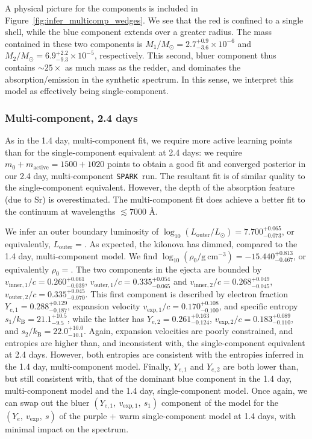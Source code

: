 \documentclass[twocolumn, twocolappendix]{aastex63}
\def\SPARK{\texttt{SPARK}}
\begin{document}
A physical picture for the components is included in Figure~\ref{fig:infer_multicomp_wedges}. We see that the red is confined to a single shell, while the blue component extends over a greater radius. The mass contained in these two components is $M_1/M_{\odot} = 2.7^{+0.9}_{-3.6} \times 10^{-6}$ and $M_2/M_{\odot} = 6.9^{+2.2}_{-9.3} \times 10^{-5}$, respectively. This second, bluer component thus contains $\sim 25 \times$ as much mass as the redder, and dominates the absorption/emission in the synthetic spectrum. In this sense, we interpret this model as effectively being single-component.



\subsubsection{Multi-component, 2.4 days}\label{sssc:2.4_multi}

As in the 1.4 day, multi-component fit, we require more active learning points than for the single-component equivalent at 2.4 days: we require $m_0 + m_{\mathrm{active}} = 1500 + 1020$ points to obtain a good fit and converged posterior in our 2.4 day, multi-component \SPARK~run. The resultant fit is of similar quality to the single-component equivalent. However, the depth of the absorption feature (due to Sr) is overestimated. The multi-component fit does achieve a better fit to the continuum at wavelengths $\lesssim 7000$ \AA. 

We infer an outer boundary luminosity of $\log_{10} (L_{\mathrm{outer}}/L_{\odot}) = 7.700^{+0.065}_{-0.073}$, or equivalently, $L_{\mathrm{outer}} = $. As expected, the kilonova has dimmed, compared to the 1.4 day, multi-component model. We find $\log_{10} (\rho_0 / \mathrm{g~cm^{-3}}) = -15.440^{+0.813}_{-0.467}$, or equivalently $\rho_0 = $. The two components in the ejecta are bounded by $v_{\mathrm{inner,1}}/c = 0.260^{+0.061}_{-0.039}$, $v_{\mathrm{outer,1}}/c = 0.335^{+0.054}_{-0.065}$ and $v_{\mathrm{inner,2}}/c = 0.268^{+0.049}_{-0.045}$, $v_{\mathrm{outer,2}}/c = 0.335^{+0.045}_{-0.070}$. This first component is described by electron fraction $Y_{e,1} = 0.288^{+0.129}_{-0.187}$, expansion velocity $v_{\mathrm{exp},1}/c = 0.170^{+0.108}_{-0.100}$, and specific entropy $s_1 / k_{\mathrm{B}} = 21.1^{+10.5}_{-9.5}$, while the latter has $Y_{e,2} = 0.261^{+0.163}_{-0.124}$, $v_{\mathrm{exp},2}/c = 0.183^{+0.089}_{-0.110}$, and $s_2 / k_{\mathrm{B}} = 22.0^{+10.0}_{-10.1}$. Again, expansion velocities are poorly constrained, and entropies are higher than, and inconsistent with, the single-component equivalent at 2.4 days. However, both entropies are consistent with the entropies inferred in the 1.4 day, multi-component model. Finally, $Y_{e,1}$ and $Y_{e,2}$ are both lower than, but still consistent with, that of the dominant blue component in the 1.4 day, multi-component model and the 1.4 day, single-component model. Once again, we can swap out the bluer $(Y_{e,1},~v_{\mathrm{exp},1},~s_1)$ component of the model for the $(Y_e,~v_{\mathrm{exp}},~s)$ of the purple + warm single-component model at 1.4 days, with minimal impact on the spectrum. 
\end{document}
